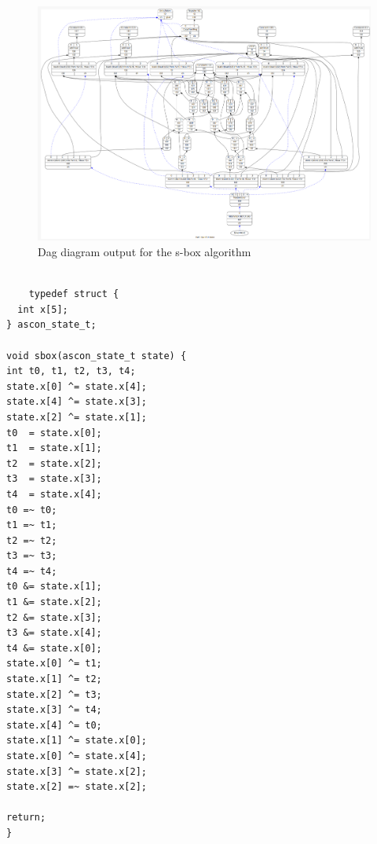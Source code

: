 \begin{figure}
    \centering
    \includegraphics[scale=0.35]{adding_new_instr/naxor_dag_diagram.png}
    \caption{Dag diagram output for the s-box algorithm}
    \label{fig:naxor_dag_diagram}
\end{figure}

\begin{lstlisting}[caption= C code input for the S-box algorithm]

	typedef struct {
  int x[5];
} ascon_state_t;

void sbox(ascon_state_t state) {
int t0, t1, t2, t3, t4;
state.x[0] ^= state.x[4];
state.x[4] ^= state.x[3];
state.x[2] ^= state.x[1];
t0  = state.x[0];
t1  = state.x[1];
t2  = state.x[2];
t3  = state.x[3];
t4  = state.x[4];
t0 =~ t0;    
t1 =~ t1;    
t2 =~ t2;    
t3 =~ t3;    
t4 =~ t4;
t0 &= state.x[1];
t1 &= state.x[2];
t2 &= state.x[3];
t3 &= state.x[4];
t4 &= state.x[0];
state.x[0] ^= t1;
state.x[1] ^= t2;
state.x[2] ^= t3;
state.x[3] ^= t4;
state.x[4] ^= t0;
state.x[1] ^= state.x[0];
state.x[0] ^= state.x[4];
state.x[3] ^= state.x[2];
state.x[2] =~ state.x[2];

return;
}

\end{lstlisting}

\begin{minipage}{0.95\linewidth}



\end{minipage}

